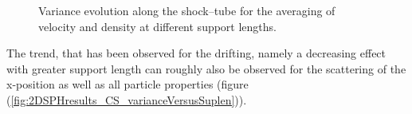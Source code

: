 \documentclass[11pt,a4paper,twoside]{report}
\begin{document}
\begin{figure}[!htbp]
\centering
\label{fig:2DSPHresults_CS_variance}

\caption[Variance of propertiesof 2D particle distribution for shock--tube]{Variance evolution along the shock--tube for the averaging of velocity and density at different support lengths.}

\end{figure}

The trend, that has been observed for the drifting, namely a decreasing effect with greater support length can roughly also be observed for the scattering of the x-position as well as all particle properties (figure (\ref{fig:2DSPHresults_CS_varianceVersusSuplen})).
\end{document}
